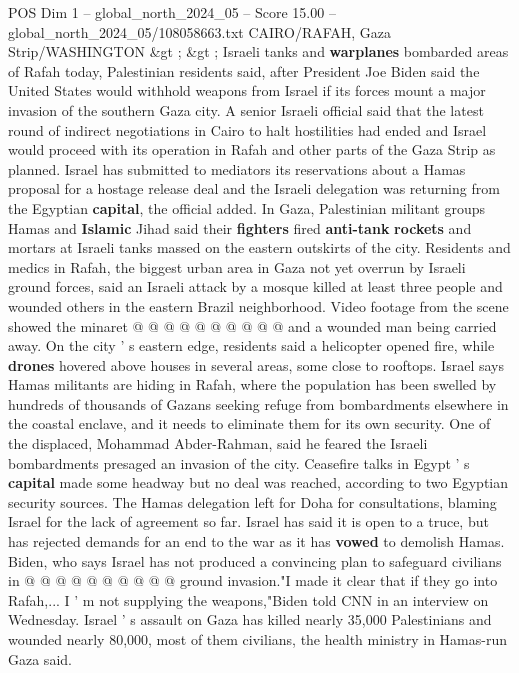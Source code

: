\begin{textsample}{POS Dim 1 – global\_north\_2024\_05 – Score 15.00 – global\_north\_2024\_05/108058663.txt}  \label{ex:f1_pos_406}
CAIRO/RAFAH, Gaza Strip/WASHINGTON \&gt ; \&gt ; Israeli tanks and \textbf{warplanes} bombarded areas of Rafah today, Palestinian residents said, after President Joe Biden said the United States would withhold weapons from Israel if its forces mount a major invasion of the southern Gaza city.
A senior Israeli official said that the latest round of indirect negotiations in Cairo to halt hostilities had ended and Israel would proceed with its operation in Rafah and other parts of the Gaza Strip as planned.
Israel has submitted to mediators its reservations about a Hamas proposal for a hostage release deal and the Israeli delegation was returning from the Egyptian \textbf{capital}, the official added.
In Gaza, Palestinian militant groups Hamas and \textbf{Islamic} Jihad said their \textbf{fighters} fired \textbf{anti-tank} \textbf{rockets} and mortars at Israeli tanks massed on the eastern outskirts of the city.
Residents and medics in Rafah, the biggest urban area in Gaza not yet overrun by Israeli ground forces, said an Israeli attack by a mosque killed at least three people and wounded others in the eastern Brazil neighborhood.
Video footage from the scene showed the minaret @ @ @ @ @ @ @ @ @ @ and a wounded man being carried away.
On the city ' s eastern edge, residents said a helicopter opened fire, while \textbf{drones} hovered above houses in several areas, some close to rooftops.
Israel says Hamas militants are hiding in Rafah, where the population has been swelled by hundreds of thousands of Gazans seeking refuge from bombardments elsewhere in the coastal enclave, and it needs to eliminate them for its own security.
One of the displaced, Mohammad Abder-Rahman, said he feared the Israeli bombardments presaged an invasion of the city.
Ceasefire talks in Egypt ' s \textbf{capital} made some headway but no deal was reached, according to two Egyptian security sources.
The Hamas delegation left for Doha for consultations, blaming Israel for the lack of agreement so far.
Israel has said it is open to a truce, but has rejected demands for an end to the war as it has \textbf{vowed} to demolish Hamas.
Biden, who says Israel has not produced a convincing plan to safeguard civilians in @ @ @ @ @ @ @ @ @ @ ground invasion."I made it clear that if they go into Rafah,...
I ' m not supplying the weapons,"Biden told CNN in an interview on Wednesday.
Israel ' s assault on Gaza has killed nearly 35,000 Palestinians and wounded nearly 80,000, most of them civilians, the health ministry in Hamas-run Gaza said.

\end{textsample}
